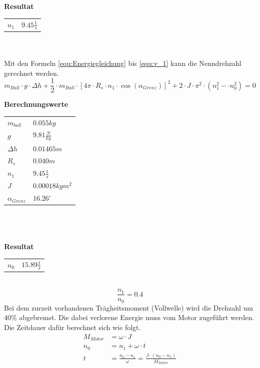 \\
\\
\textbf{Resultat}\\
\begin{tabular}{ll}
	\rule{0pt}{11pt} $n_1$ & $9.45 \frac{1}{s}$ \\
\end{tabular}\\
\\
Mit den Formeln \ref{equ:Energiegleichung} bis \ref{equ:v_1} kann die Nenndrehzahl gerechnet werden.
\begin{equation}
	m_{Ball} \cdot g \cdot \Delta h + \frac{1}{2} \cdot m_{Ball} \cdot \left[4\pi 
	\cdot R_s \cdot n_1 \cdot \cos(\alpha_{Grenz})\right]^2 + 2 \cdot J \cdot \pi^2 
	\cdot \left(n_1^2-\cdot n_0^2\right) = 0
\end{equation}

\textbf{Berechnungswerte}\\
\begin{tabular}{ll}
	\rule{0pt}{11pt} $m_{ball}$ & $0.055 kg$ \\
	\rule{0pt}{11pt} $g$ & $9.81 \frac{N}{kg}$ \\
	\rule{0pt}{11pt} $\Delta h$ & $0.01465 m$ \\
	\rule{0pt}{11pt} $R_s$ & $0.040 m$ \\
	\rule{0pt}{11pt} $n_1$ & $9.45\frac{1}{s}$ \\
	\rule{0pt}{11pt} $J$ & $0.00018 kgm^2$ \\
	\rule{0pt}{11pt} $\alpha_{Grenz}$ & $16.26^\circ$ \\
\end{tabular}\\
\\
\\
\textbf{Resultat}\\
\begin{tabular}{ll}
	\rule{0pt}{11pt} $n_0$ & $15.89 \frac{1}{s}$ \\
\end{tabular}\\
\begin{equation}
	\frac{n_1}{n_0} = 0.4 \label{equ_Prozentwert}
\end{equation}
Bei dem zurzeit vorhandenen Trägheitsmoment (Vollwelle) wird die Drehzahl um 40\% 
abgebremst. Die dabei verlorene Energie muss vom Motor zugeführt werden. 
Die Zeitdauer dafür berechnet sich wie folgt.
\begin{align}
	M_{Motor} &= \omega \cdot J \\
	n_0 &= n_1 + \omega \cdot t \\
	t &= \frac{n_0 - n_1}{\omega} = \frac{J \cdot \left(n_0 - n_1\right)}{M_{Motor}}
\end{align}

